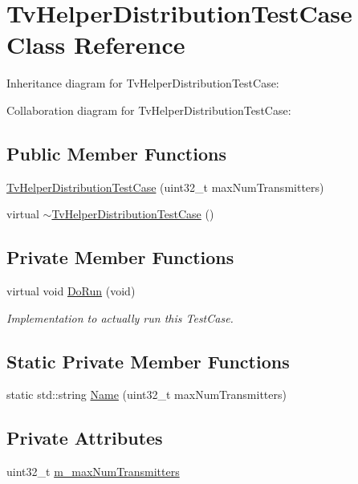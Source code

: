 \hypertarget{classTvHelperDistributionTestCase}{}\section{Tv\+Helper\+Distribution\+Test\+Case Class Reference}
\label{classTvHelperDistributionTestCase}


Inheritance diagram for Tv\+Helper\+Distribution\+Test\+Case\+:


Collaboration diagram for Tv\+Helper\+Distribution\+Test\+Case\+:
\subsection*{Public Member Functions}
\begin{DoxyCompactItemize}
\item 
\hyperlink{classTvHelperDistributionTestCase_ac0e654dfaadab070949f1795d7115b7f}{Tv\+Helper\+Distribution\+Test\+Case} (uint32\+\_\+t max\+Num\+Transmitters)
\item 
virtual \hyperlink{classTvHelperDistributionTestCase_aaece92a07a16897cfc207138cbcee9a4}{$\sim$\+Tv\+Helper\+Distribution\+Test\+Case} ()
\end{DoxyCompactItemize}
\subsection*{Private Member Functions}
\begin{DoxyCompactItemize}
\item 
virtual void \hyperlink{classTvHelperDistributionTestCase_a34741e4aaf8de395bd978c044f941092}{Do\+Run} (void)
\begin{DoxyCompactList}\small\item\em Implementation to actually run this Test\+Case. \end{DoxyCompactList}\end{DoxyCompactItemize}
\subsection*{Static Private Member Functions}
\begin{DoxyCompactItemize}
\item 
static std\+::string \hyperlink{classTvHelperDistributionTestCase_ac152a379d13752d510da563d0896ebf2}{Name} (uint32\+\_\+t max\+Num\+Transmitters)
\end{DoxyCompactItemize}
\subsection*{Private Attributes}
\begin{DoxyCompactItemize}
\item 
uint32\+\_\+t \hyperlink{classTvHelperDistributionTestCase_ae226743c2fe9b0e15245b5a7be57db20}{m\+\_\+max\+Num\+Transmitters}
\end{DoxyCompactItemize}
